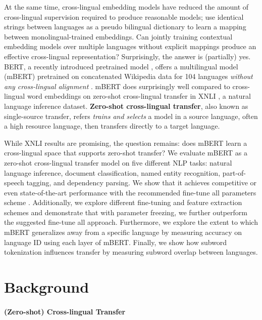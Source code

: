 \documentclass[11pt,a4paper]{article}
\begin{document}
At the same time, cross-lingual embedding models have reduced the amount of cross-lingual supervision required to produce reasonable models;  use identical strings between languages as a pseudo bilingual dictionary to learn a mapping between monolingual-trained embeddings.
Can jointly training contextual embedding models over multiple languages without explicit mappings produce an effective cross-lingual representation?
Surprisingly, the answer is (partially) yes. BERT, a recently introduced pretrained model \cite{devlin-etal-2019-bert}, offers a multilingual model (mBERT) pretrained on concatenated Wikipedia data for 104 languages {\em without any cross-lingual alignment} \cite{multilingualBERTmd}. mBERT does surprisingly well compared to cross-lingual word embeddings on zero-shot cross-lingual transfer in XNLI \cite{conneau-etal-2018-xnli}, a natural language inference dataset. {\bf Zero-shot cross-lingual transfer}, also known as single-source transfer, refers \textit{trains and selects} a model in a source language, often a high resource language, then transfers directly to a target language.

While XNLI results are promising, the question remains: does mBERT learn a cross-lingual space that supports zero-shot transfer? We evaluate mBERT as a zero-shot cross-lingual transfer model on five different NLP tasks: natural language inference, document classification, named entity recognition, part-of-speech tagging, and dependency parsing. We show that it achieves competitive or even state-of-the-art performance with the recommended fine-tune all parameters scheme \cite{devlin-etal-2019-bert}. Additionally, we explore different fine-tuning and feature extraction schemes and demonstrate that with parameter freezing, we further outperform the suggested fine-tune all approach. Furthermore, we explore
the extent to which mBERT generalizes away from a specific language by measuring accuracy on language ID using each layer of mBERT. Finally, we show how subword tokenization influences transfer by measuring subword overlap between languages.


\section{Background}

\paragraph{(Zero-shot) Cross-lingual Transfer}
\end{document}

